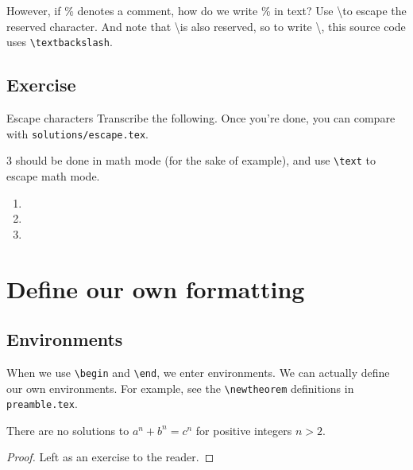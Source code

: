\documentclass{article}
\begin{document}
However, if \% denotes a comment, how do we write \% in text? Use \textbackslash to escape the reserved character. And note that \textbackslash is also reserved, so to write \textbackslash, this source code uses \texttt{\textbackslash textbackslash}.

\subsection{Exercise}

\begin{exercise}{Escape characters}{}
    Transcribe the following. Once you're done, you can compare with \texttt{solutions/escape.tex}.

    

    3 should be done in math mode (for the sake of example), and use \texttt{\textbackslash text} to escape math mode.
    
\end{exercise}

\begin{solution}{}{}
    \begin{enumerate}
        \item 
        \item 
        \item 
    \end{enumerate}
\end{solution}

\section{Define our own formatting}

\subsection{Environments}

When we use \texttt{\textbackslash begin} and \texttt{\textbackslash end}, we enter environments. We can actually define our own environments. For example, see the \texttt{\textbackslash newtheorem} definitions in \texttt{preamble.tex}.

\begin{theorem}
    There are no solutions to $a^n+b^n=c^n$ for positive integers $n > 2$.
\end{theorem}

\begin{proof}
    Left as an exercise to the reader.
\end{proof}
\end{document}
